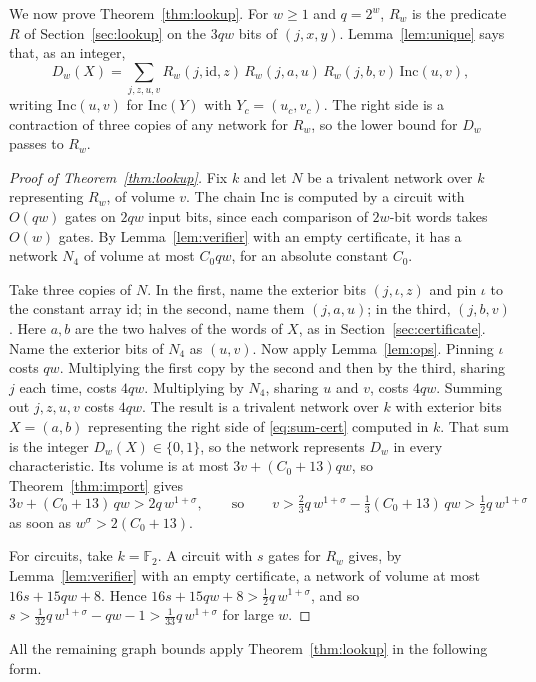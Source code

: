 \documentclass[11pt]{article}
\theoremstyle{definition}
\theoremstyle{remark}
\newcommand{\F}{\mathbb{F}}
\newcommand{\Inc}{\mathrm{Inc}}
\newcommand{\id}{\mathrm{id}}
\begin{document}
We now prove Theorem~\ref{thm:lookup}. For $w\ge1$ and $q=2^w$, $R_w$ is
the predicate $R$ of Section~\ref{sec:lookup} on the $3qw$ bits of
$(j,x,y)$. Lemma~\ref{lem:unique} says that, as an integer,
\begin{equation}\label{eq:sum-cert}
D_w(X)=\sum_{j,z,u,v}R_w(j,\id,z)\,R_w(j,a,u)\,R_w(j,b,v)\,\Inc(u,v),
\end{equation}
writing $\Inc(u,v)$ for $\Inc(Y)$ with $Y_c=(u_c,v_c)$. The right side is
a contraction of three copies of any network for $R_w$, so the lower bound
for $D_w$ passes to $R_w$.

\begin{proof}[Proof of Theorem~\ref{thm:lookup}]
Fix $k$ and let $N$ be a trivalent network over $k$ representing $R_w$,
of volume $v$. The chain $\Inc$ is computed by a circuit with $O(qw)$
gates on $2qw$ input bits, since each comparison of $2w$-bit words takes
$O(w)$ gates. By Lemma~\ref{lem:verifier} with an empty certificate, it
has a network $N_4$ of volume at most $C_0qw$, for an absolute constant
$C_0$.

Take three copies of $N$. In the first, name the exterior bits
$(j,\iota,z)$ and pin $\iota$ to the constant array $\id$; in the second,
name them $(j,a,u)$; in the third, $(j,b,v)$. Here $a,b$ are the two
halves of the words of $X$, as in Section~\ref{sec:certificate}. Name the
exterior bits of $N_4$ as $(u,v)$. Now apply Lemma~\ref{lem:ops}. Pinning
$\iota$ costs $qw$. Multiplying the first copy by the second and then by
the third, sharing $j$ each time, costs $4qw$. Multiplying by $N_4$,
sharing $u$ and $v$, costs $4qw$. Summing out $j,z,u,v$ costs $4qw$. The
result is a trivalent network over $k$ with exterior bits $X=(a,b)$
representing the right side of \eqref{eq:sum-cert} computed in $k$. That
sum is the integer $D_w(X)\in\{0,1\}$, so the network represents $D_w$ in
every characteristic. Its volume is at most $3v+(C_0+13)qw$, so
Theorem~\ref{thm:import} gives
\[
3v+(C_0+13)\,qw>2q\,w^{1+\sigma},
\qquad\text{so}\qquad
v>\tfrac23q\,w^{1+\sigma}-\tfrac13(C_0+13)\,qw>\tfrac12q\,w^{1+\sigma}
\]
as soon as $w^\sigma>2(C_0+13)$.

For circuits, take $k=\F_2$. A circuit with $s$ gates for $R_w$ gives, by
Lemma~\ref{lem:verifier} with an empty certificate, a network of volume at
most $16s+15qw+8$. Hence $16s+15qw+8>\tfrac12q\,w^{1+\sigma}$, and so
$s>\tfrac1{32}q\,w^{1+\sigma}-qw-1>\tfrac1{33}q\,w^{1+\sigma}$ for large
$w$.
\end{proof}

All the remaining graph bounds apply Theorem~\ref{thm:lookup} in the
following form.
\end{document}
